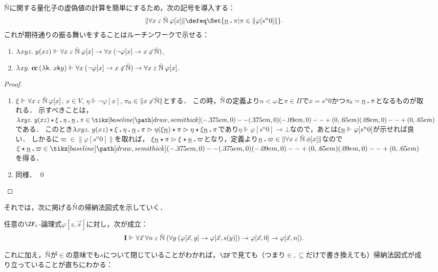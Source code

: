 \documentclass[realisability.tex]{subfiles}
\begin{document}
$\mathord{\tilde{\mathbb{N}}}$に関する量化子の虚偽値の計算を簡単にするため，次の記号を導入する：
\[
 \|\forall x \strin \NN\: \varphi[x]\| \defeq \Set{ \underline{n} \push \pi | {\pi \in \|\varphi[s^n 0]\|}}.
\]
これが期待通りの振る舞いをすることはルーチンワークで示せる：
\begin{lemma}
 \begin{enumerate}
  \item $\lambda^{\mathsf{}}xyz.\;y(xz) \Vdash \forall x \mathrel{\varepsilon} \mathord{\tilde{\mathbb{N}}} \: \varphi[x] \to \forall x \:(\neg \varphi[x] \to x \not\mathrel{\varepsilon} \mathord{\tilde{\mathbb{N}}})$,
  \item $\lambda^{\mathsf{}}xy.\;\mathsf{\mathbf{c\hspace{-1pt}c}} \,(\lambda^{\mathsf{}}\mathsf{k}.\;x \mathsf{k} y) \Vdash \forall x \:(\neg \varphi[x] \to x \not\mathrel{\varepsilon} \mathord{\tilde{\mathbb{N}}}) \to \forall x \mathrel{\varepsilon} \mathord{\tilde{\mathbb{N}}} \: \varphi[x]$.
 \end{enumerate}
\end{lemma}
\begin{proof}
 \begin{enumerate}
  \item $\xi \Vdash \forall x \mathrel{\varepsilon} \mathord{\tilde{\mathbb{N}}}\: \varphi[x]$, $x \in V$, $\eta \Vdash \neg \varphi[x]$, $\pi_0 \in \|x \not\mathrel{\varepsilon} \mathord{\tilde{\mathbb{N}}}\|$とする．
        この時，$\mathord{\tilde{\mathbb{N}}}$の定義より$n < \omega$と$\pi \in \Pi$で$x = s^n 0$かつ$\pi_0 = \underline{n} \mathbin{\boldsymbol{.}} \pi$となるものが取れる．
        示すべきことは，$\KVM{{\abs{xyz}{y(xz)}}{\xi}{\eta}{\num{n}}{\pi}} \in \pole$である．
        このとき$\KVM{{\abs{xyz}{y(xz)}}{\xi}{\eta}{\num{n}}{\pi}} \reds \KVM{{\eta(\xi \num{n})}{\pi}} \redsto \KVM{{\eta}{{\xi \num{n}}}{\pi}}$であり$\eta \Vdash \varphi[s^n 0] \to \bot$なので，あとは$\xi \underline{n} \Vdash \varphi[s^n 0]$が示せれば良い．
        しかるに$\varpi \in \|\varphi[s^n 0]\|$を取れば，
        $\KVM{{\xi \num{n}} \pi} \redsto \KVM{\xi {{\num{n}}} \varpi}$となり，定義より$\underline{n} \mathbin{\boldsymbol{.}} \varpi \in \|\forall x \mathrel{\varepsilon} \mathord{\tilde{\mathbb{N}}}\: \phi[x]\|$なので$\KVM{\xi{{\num{n}}} \varpi} \in \pole$を得る．
  \item 同様． \qed
 \end{enumerate}
\end{proof}

それでは，次に掲げる$\mathord{\tilde{\mathbb{N}}}$の帰納法図式を示していく．
\begin{lemma}\label{lem:ZFe-ind-nat}
 任意の$\ZF_{\varepsilon}$-論理式$\varphi[z, \vec{x}]$に対し，次が成立：
 \[
  \mathsf{\mathbf{I}} \Vdash \forall \vec{x}\: \forall n \mathrel{\varepsilon} \mathord{\tilde{\mathbb{N}}} \:(\forall y\: (\varphi[\vec{x}, y] \to \varphi[\vec{x}, s(y)]) \to \varphi[\vec{x}, 0] \to \varphi[\vec{x}, n]).
 \]
\end{lemma}
これに加え，$\mathord{\tilde{\mathbb{N}}}$が${\in}$の意味でも$s$について閉じていることがわかれば，$\ZF$で見ても（つまり${\in}, {\subseteq}$だけで書き換えても）帰納法図式が成り立っていることが直ちにわかる：
\end{document}
